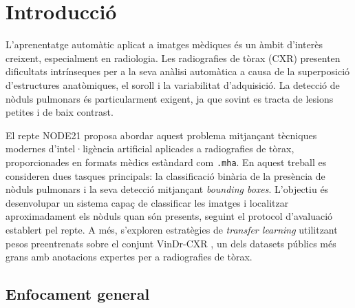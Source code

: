 \documentclass[conference]{IEEEtran}
\begin{document}
\begin{abstract}
Finalment, s’exploren extensions basades en funcions de pèrdua avançades i mecanismes
d’atenció, que confirmen un comportament estable però sense millores substancials
sobre configuracions ja optimitzades. El treball conclou destacant la importància
de l’alineació entre el domini del preentrenament i la tasca clínica objectiu, i
planteja com a treball futur la validació prospectiva del sistema en un entorn
hospitalari real, així com la possible construcció d’un sistema \textit{ensemble}
que combini models de dues etapes i detectors moderns d’una sola etapa per explotar
les fortaleses complementàries de cada aproximació.
\end{abstract}



\section{\textbf{Introducció}}


L’aprenentatge automàtic aplicat a imatges mèdiques és un àmbit d’interès creixent, especialment en radiologia. Les radiografies de tòrax (CXR) presenten dificultats intrínseques per a la seva anàlisi automàtica a causa de la superposició d’estructures anatòmiques, el soroll i la variabilitat d’adquisició. La detecció de nòduls pulmonars és particularment exigent, ja que sovint es tracta de lesions petites i de baix contrast.

El repte NODE21 \cite{behrendt2023node21,node21challenge} proposa abordar aquest problema mitjançant tècniques modernes d’intel·ligència artificial aplicades a radiografies de tòrax, proporcionades en formats mèdics estàndard com \texttt{.mha}. En aquest treball es consideren dues tasques principals: la classificació binària de la presència de nòduls pulmonars i la seva detecció mitjançant \textit{bounding boxes}. L’objectiu és desenvolupar un sistema capaç de classificar les imatges i localitzar aproximadament els nòduls quan són presents, seguint el protocol d’avaluació establert pel repte.
A més, s’exploren estratègies de \textit{transfer learning} utilitzant pesos preentrenats sobre el conjunt VinDr-CXR \cite{vindrcxr}, un dels datasets públics més grans amb anotacions expertes per a radiografies de tòrax.



\subsection{Enfocament general}
\end{document}
